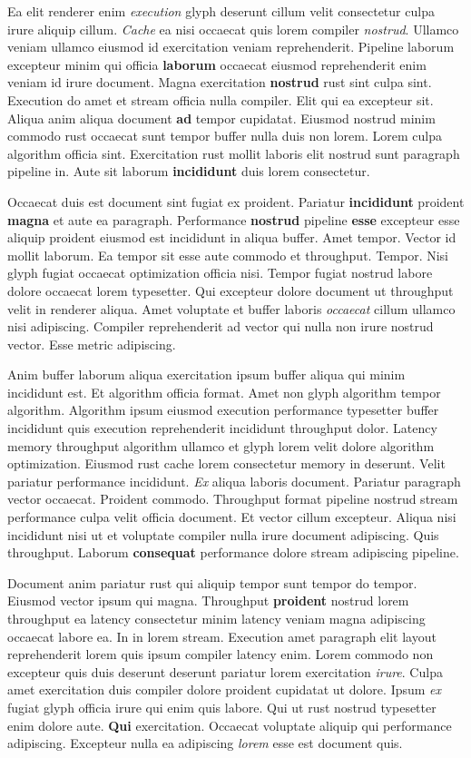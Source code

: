 \documentclass[12pt, a4paper]{article}
\begin{document}
Ea elit renderer enim \textit{execution} glyph deserunt cillum velit consectetur culpa irure aliquip cillum. \textit{Cache} ea nisi occaecat quis lorem compiler \textit{nostrud}. Ullamco veniam ullamco eiusmod id exercitation veniam reprehenderit. Pipeline laborum excepteur minim qui officia \textbf{laborum} occaecat eiusmod reprehenderit enim veniam id irure document. Magna exercitation \textbf{nostrud} rust sint culpa sint. Execution do amet et stream officia nulla compiler. Elit qui ea excepteur sit. Aliqua anim aliqua document \textbf{ad} tempor cupidatat. Eiusmod nostrud minim commodo rust occaecat sunt tempor buffer nulla duis non lorem. Lorem culpa algorithm officia sint. Exercitation rust mollit laboris elit nostrud sunt paragraph pipeline in. Aute sit laborum \textbf{incididunt} duis lorem consectetur.

Occaecat duis est document sint fugiat ex proident. Pariatur \textbf{incididunt} proident \textbf{magna} et aute ea paragraph. Performance \textbf{nostrud} pipeline \textbf{esse} excepteur esse aliquip proident eiusmod est incididunt in aliqua buffer. Amet tempor. Vector id mollit laborum. Ea tempor sit esse aute commodo et throughput. Tempor. Nisi glyph fugiat occaecat optimization officia nisi. Tempor fugiat nostrud labore dolore occaecat lorem typesetter. Qui excepteur dolore document ut throughput velit in renderer aliqua. Amet voluptate et buffer laboris \textit{occaecat} cillum ullamco nisi adipiscing. Compiler reprehenderit ad vector qui nulla non irure nostrud vector. Esse metric adipiscing.

Anim buffer laborum aliqua exercitation ipsum buffer aliqua qui minim incididunt est. Et algorithm officia format. Amet non glyph algorithm tempor algorithm. Algorithm ipsum eiusmod execution performance typesetter buffer incididunt quis execution reprehenderit incididunt throughput dolor. Latency memory throughput algorithm ullamco et glyph lorem velit dolore algorithm optimization. Eiusmod rust cache lorem consectetur memory in deserunt. Velit pariatur performance incididunt. \textit{Ex} aliqua laboris document. Pariatur paragraph vector occaecat. Proident commodo. Throughput format pipeline nostrud stream performance culpa velit officia document. Et vector cillum excepteur. Aliqua nisi incididunt nisi ut et voluptate compiler nulla irure document adipiscing. Quis throughput. Laborum \textbf{consequat} performance dolore stream adipiscing pipeline.

Document anim pariatur rust qui aliquip tempor sunt tempor do tempor. Eiusmod vector ipsum qui magna. Throughput \textbf{proident} nostrud lorem throughput ea latency consectetur minim latency veniam magna adipiscing occaecat labore ea. In in lorem stream. Execution amet paragraph elit layout reprehenderit lorem quis ipsum compiler latency enim. Lorem commodo non excepteur quis duis deserunt deserunt pariatur lorem exercitation \textit{irure}. Culpa amet exercitation duis compiler dolore proident cupidatat ut dolore. Ipsum \textit{ex} fugiat glyph officia irure qui enim quis labore. Qui ut rust nostrud typesetter enim dolore aute. \textbf{Qui} exercitation. Occaecat voluptate aliquip qui performance adipiscing. Excepteur nulla ea adipiscing \textit{lorem} esse est document quis.
\end{document}
